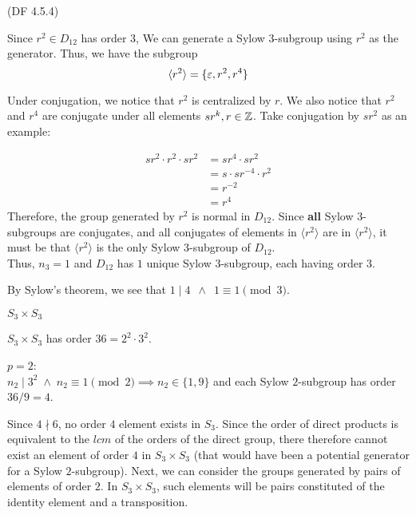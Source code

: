 \begin{problem}{(\textsf{DF 4.5.4})}
\begin{enumalph}
\begin{Answer}
\begin{enumalph}
\begin{enumalph}
              \noindent
              Since $r^2 \in D_{12}$ has order $3$,
              We can generate a Sylow $3$-subgroup using $r^2$ as the generator.
              Thus, we have the subgroup \[\langle r^2 \rangle = \{\varepsilon, r^2, r^4 \}\]

              Under conjugation, we notice that $r^2$ is centralized by $r$.
              We also notice that $r^2$ and $r^4$ are conjugate under all elements
              $sr^k, r \in \mathbb{Z}$.
              Take conjugation by $sr^2$ as an example:

              \begin{align*}
                sr^2 \cdot r^2 \cdot sr^2 &= sr^4 \cdot sr^2 \\
                &= s \cdot sr^{-4} \cdot r^2 \\
                &= r^{-2} \\
                &= r^4
              \end{align*}
              Therefore, the group generated by $r^2$ is normal in $D_{12}$.
              Since \textbf{all} Sylow $3$-subgroups are conjugates,
              and all conjugates of elements in $\langle r^2 \rangle$ are in
              $\langle r^2 \rangle$,
              it must be that $\langle r^2 \rangle$ is the only Sylow
              $3$-subgroup of $D_{12}$.\\
              Thus, $n_3 = 1$ and $D_{12}$ has $1$ unique Sylow $3$-subgroup,
              each having order $3$.
              
              \noindent
              By Sylow's theorem, we see that $1 \mid 4\ \; \land \;\ 1 \equiv 1 \pmod 3$.
          \end{enumalph}

        \bigskip
        \item $S_3 \times S_3$
            
            \noindent
            $S_3 \times S_3$ has order $36 = 2^2 \cdot 3^2$.
            \begin{enumalph}
              \bigskip
              \item $p=2$:\\
                $n_2 \mid 3^2 \; \land \; n_2 \equiv 1 \pmod 2 \implies n_2 \in \{1, 9\}$
                and each Sylow $2$-subgroup has order $36 / 9 = 4$.
                
                \noindent
                Since $4 \nmid 6$, no order $4$ element exists in $S_3$.
                Since the order of direct products is equivalent to the
                $lcm$ of the orders of the direct group, there therefore cannot exist
                an element of order $4$ in $S_3 \times S_3$ (that would have been
                a potential generator for a Sylow $2$-subgroup).
                Next, we can consider the groups generated by pairs of elements of order $2$.
                In $S_3  \times S_3$, such elements will be pairs constituted of
                the identity element and a transposition.


\end{enumalph}
\end{enumalph}
\end{Answer}
\end{enumalph}
\end{problem}
